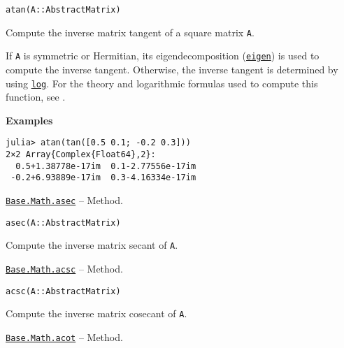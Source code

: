 \begin{adjustwidth}{2em}{0pt}


\begin{verbatim}
atan(A::AbstractMatrix)
\end{verbatim}

Compute the inverse matrix tangent of a square matrix \texttt{A}.

If \texttt{A} is symmetric or Hermitian, its eigendecomposition (\hyperlink{11056016707394839114}{\texttt{eigen}}) is used to compute the inverse tangent. Otherwise, the inverse tangent is determined by using \hyperlink{17317607370922767936}{\texttt{log}}.  For the theory and logarithmic formulas used to compute this function, see \footnotemark[14].

\textbf{Examples}


\begin{verbatim}
julia> atan(tan([0.5 0.1; -0.2 0.3]))
2×2 Array{Complex{Float64},2}:
  0.5+1.38778e-17im  0.1-2.77556e-17im
 -0.2+6.93889e-17im  0.3-4.16334e-17im
\end{verbatim}



\end{adjustwidth}
\hypertarget{18059102985382682628}{} 
\hyperlink{18059102985382682628}{\texttt{Base.Math.asec}}  -- {Method.}

\begin{adjustwidth}{2em}{0pt}


\begin{verbatim}
asec(A::AbstractMatrix)
\end{verbatim}

Compute the inverse matrix secant of \texttt{A}. 



\end{adjustwidth}
\hypertarget{1996732052493549393}{} 
\hyperlink{1996732052493549393}{\texttt{Base.Math.acsc}}  -- {Method.}

\begin{adjustwidth}{2em}{0pt}


\begin{verbatim}
acsc(A::AbstractMatrix)
\end{verbatim}

Compute the inverse matrix cosecant of \texttt{A}. 



\end{adjustwidth}
\hypertarget{10418731786659005321}{} 
\hyperlink{10418731786659005321}{\texttt{Base.Math.acot}}  -- {Method.}

